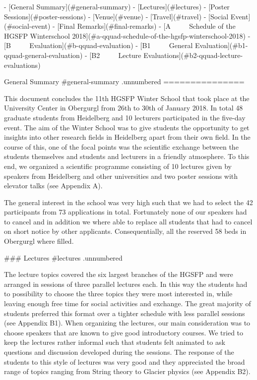 -   [General Summary](#general-summary)
    -   [Lectures](#lectures)
    -   [Poster Sessions](#poster-sessions)
    -   [Venue](#venue)
    -   [Travel](#travel)
    -   [Social Event](#social-event)
    -   [Final Remarks](#final-remarks)
-   [A $\qquad$ Schedule of the HGSFP Winterschool
    2018](#a-qquad-schedule-of-the-hgsfp-winterschool-2018)
-   [B $\qquad$ Evaluation](#b-qquad-evaluation)
    -   [B1 $\qquad$ General Evaluation](#b1-qquad-general-evaluation)
    -   [B2 $\qquad$ Lecture Evaluations](#b2-qquad-lecture-evaluations)

General Summary {#general-summary .unnumbered}
===============

This document concludes the 11th HGSFP Winter School that took place at
the University Center in Obergurgl from 26th to 30th of January 2018. In
total 48 graduate students from Heidelberg and 10 lecturers participated
in the five-day event. The aim of the Winter School was to give students
the opportunity to get insights into other research fields in
Heidelberg apart from their own field. In the course of this, one of the
focal points was the scientific exchange between the students
themselves and students and lecturers in a friendly atmosphere. To this
end, we organized a scientific programme consisting of 10 lectures given
by speakers from Heidelberg and other universities and two poster
sessions with elevator talks (see Appendix A).

The general interest in the school was very high such that we had to
select the 42 participants from 73 applications in total.
Fortunately none of our speakers had to cancel and in addition we where
able to replace all students that had to cancel on short notice by other
applicants. Consequentially, all the reserved 58 beds in Obergurgl where
filled.

### Lectures {#lectures .unnumbered}

The lecture topics covered the six largest branches of the HGSFP and were
arranged in sessions of three parallel lectures each. In this way the
students had to possibility to choose the three topics they were most
interested in, while leaving enough free time for social activities and
exchange. The great majority of students preferred this format over a
tighter schedule with less parallel sessions (see Appendix B1). When
organizing the lectures, our main consideration was to choose
speakers that are known to give good introductory courses. We tried to
keep the lectures rather informal such that students felt animated to
ask questions and discussion developed during the sessions. The response
of the students to this style of lectures was very good and they
appreciated the broad range of topics ranging from String theory to Glacier
physics (see Appendix B2).

